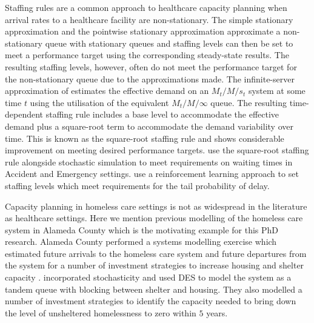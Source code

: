 \documentclass[12pt,a4paper]{article}
\begin{document}
Staffing rules are a common approach to healthcare capacity planning when arrival rates to a healthcare facility are non-stationary. The simple stationary approximation \citep{green1991some} and the pointwise stationary approximation \citep{green1991pointwise} approximate a non-stationary queue with stationary queues and staffing levels can then be set to meet a performance target using the corresponding steady-state results. The resulting staffing levels, however, often do not meet the performance target for the non-stationary queue due to the approximations made. The infinite-server approximation of \cite{jennings1996server} estimates the effective demand on an $M_t/M/s_t$ system at some time $t$ using the utilisation of the equivalent $M_t/M/\infty$ queue. The resulting time-dependent staffing rule includes a base level to accommodate the effective demand plus a square-root term to accommodate the demand variability over time. This is known as the square-root staffing rule and shows considerable improvement on meeting desired performance targets. \cite{izady2012setting} use the square-root staffing rule alongside stochastic simulation to meet requirements on waiting times in Accident and Emergency settings. \cite{konrad2023achieving} use a reinforcement learning approach to set staffing levels which meet requirements for the tail probability of delay. 

Capacity planning in homeless care settings is not as widespread in the literature as healthcare settings. Here we mention previous modelling of the homeless care system in Alameda County which is the motivating example for this PhD research. Alameda County performed a systems modelling exercise which estimated future arrivals to the homeless care system and future departures from the system for a number of investment strategies to increase housing and shelter capacity \citep{hometogether2022}. \cite{singham2023discrete} incorporated stochasticity and used DES to model the system as a tandem queue with blocking between shelter and housing. They also modelled a number of investment strategies to identify the capacity needed to bring down the level of unsheltered homelessness to zero within $5$ years.
\end{document}
